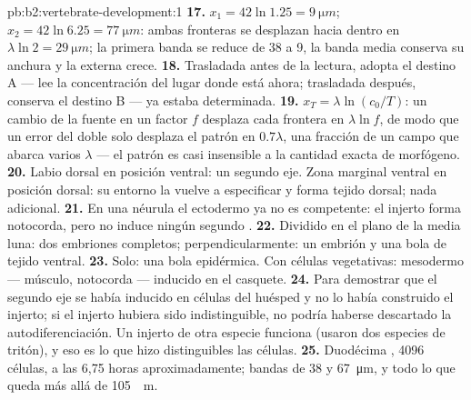 \begin{solution}{pb:b2:vertebrate-development:1}
\textbf{17.} $x_1 = 42\ln 1.25 = \qty{9}{\micro m}$; $x_2 = 42\ln 6.25
= \qty{77}{\micro m}$: ambas fronteras se desplazan hacia dentro en
$\lambda\ln 2 =
\qty{29}{\micro m}$; la primera banda se reduce de 38 a 9, la banda media
conserva su anchura y la externa crece.
\textbf{18.} Trasladada antes de la lectura, adopta el destino A --- lee
la concentración del lugar donde está ahora; trasladada después, conserva
el destino B --- ya estaba determinada.
\textbf{19.} $x_T = \lambda\ln(c_0/T)$: un cambio de la fuente en un factor
$f$ desplaza cada frontera en $\lambda\ln f$, de modo que un error del
doble solo desplaza el patrón en $0.7\lambda$, una fracción de un campo que
abarca varios $\lambda$ --- el patrón es casi insensible a la cantidad
exacta de morfógeno.
\textbf{20.} Labio dorsal en posición ventral: un segundo eje. Zona
marginal ventral en posición dorsal: su entorno la vuelve a especificar y
forma tejido dorsal; nada adicional.
\textbf{21.} En una néurula el ectodermo ya no es competente: el injerto
forma notocorda, pero no induce ningún segundo .
\textbf{22.} Dividido en el plano de la media luna: dos embriones
completos; perpendicularmente: un embrión y una bola de tejido ventral.
\textbf{23.} Solo: una bola epidérmica. Con células vegetativas: mesodermo
--- músculo, notocorda --- inducido en el casquete.
\textbf{24.} Para demostrar que el segundo eje se había inducido en
células del huésped y no lo había construido el injerto; si el injerto
hubiera sido indistinguible, no podría haberse descartado la
autodiferenciación. Un injerto de otra especie funciona (usaron dos
especies de tritón), y eso es lo que hizo distinguibles las células.
\textbf{25.} Duodécima , 4096 células, a las 6,75 horas
aproximadamente; bandas de 38 y \qty{67}{\micro m}, y todo lo que queda
más allá de \qty{105}{\micro
m}.
\end{solution}

